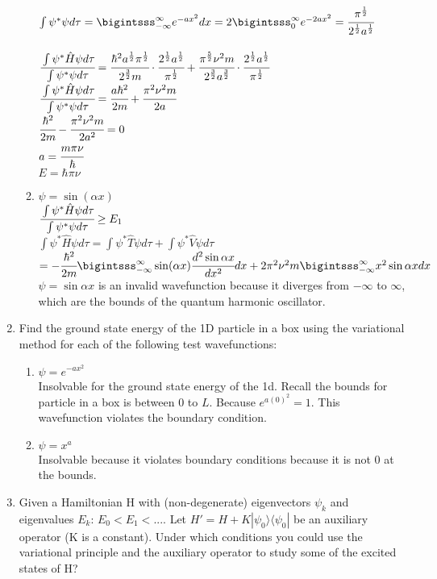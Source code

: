 \documentclass[a4paper,12pt]{article}
\begin{document}
\begin{enumerate}
\begin{enumerate}
        \\ $\int\psi^*\psi d\tau=\bigintsss_{-\infty}^\infty e^{-ax^2}dx=2\bigintsss_{0}^\infty e^{-2ax^2}=\cfrac{\pi^\frac{1}{2}}{2^\frac{1}{2}a^\frac{1}{2}}$
        \\
        \\$\cfrac{\int\psi^*\hat{H}\psi d\tau}{\int\psi^*\psi d\tau}= \cfrac{\hbar^2a^\frac{1}{2}\pi^\frac{1}{2}}{2^\frac{3}{2}m}\cdot\cfrac{2^\frac{1}{2}a^\frac{1}{2}}{\pi^\frac{1}{2}}+\cfrac{\pi^\frac{5}{2}\nu^2m}{2^\frac{3}{2}a^\frac{3}{2}}\cdot\cfrac{2^\frac{1}{2}a^\frac{1}{2}}{\pi^\frac{1}{2}}$
        \\$\cfrac{\int\psi^*\hat{H}\psi d\tau}{\int\psi^*\psi d\tau}=\cfrac{a\hbar^2}{2m}+\cfrac{\pi^2\nu^2m}{2a}$
        \\ $\cfrac{\hbar^2}{2m}-\cfrac{\pi^2\nu^2m}{2a^2}=0$ 
        \\ $a=\cfrac{m\pi\nu}{\hbar}$
        \\ $E=\hbar\pi\nu$

        \item $\psi=\sin(\alpha x)$
        \\ $\cfrac{\int\psi^*\hat{H}\psi d\tau}{\int\psi^*\psi d\tau}\ge E_1$
        \\ $\int\psi^*\hat{H}\psi d\tau=\int\psi^*\hat{T}\psi d\tau+\int\psi^*\hat{V}\psi d\tau$
        \\ $=-\cfrac{\hbar^2}{2m}\bigintsss_{-\infty}^\infty \sin(\alpha x) \cfrac{d^2\sin{\alpha x}}{dx^2}dx +2\pi^2 \nu^2m\bigintsss_{-\infty}^\infty x^2\sin{\alpha x}dx$
        \\ $\psi=\sin{\alpha x}$ is an invalid wavefunction because it diverges from $-\infty$ to $\infty$, which are the bounds of the quantum harmonic oscillator.  
    \end{enumerate}
\item Find the ground state energy of the 1D particle in a box using the variational method for each of the following test wavefunctions:
    \begin{enumerate}
        \item $\psi=e^{-ax^2}$
        \\ Insolvable for the ground state energy of the 1d. Recall the bounds for particle in a box is between $0$ to $L$. Because $e^{a(0)^2}=1$. This wavefunction violates the boundary condition. 
        \item $\psi=x^a$
        \\ Insolvable because it violates boundary conditions because it is not $0$ at the bounds.
    \end{enumerate}
\item Given a Hamiltonian H with (non-degenerate) eigenvectors $\psi_k$ and eigenvalues $E_k$: $E_0<E_1<...$. Let $H'=H+K|\psi_0\rangle\langle\psi_0|$ be an auxiliary operator (K is a constant). Under which conditions you could use the variational principle and the auxiliary operator to study some
of the excited states of H?


\end{enumerate}
\end{document}
